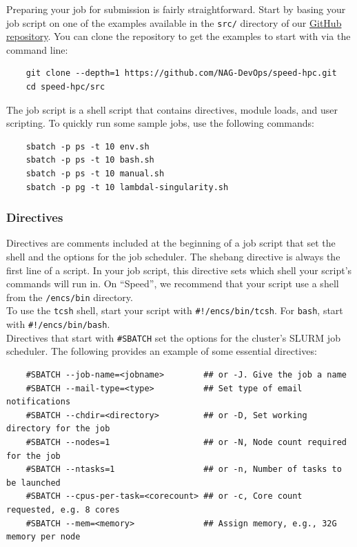 
Preparing your job for submission is fairly straightforward.
Start by basing your job script on one of the examples available in the \texttt{src/}
directory of our \href{https://github.com/NAG-DevOps/speed-hpc}{GitHub repository}.
You can clone the repository to get the examples to start with via the command line:

\begin{verbatim}
    git clone --depth=1 https://github.com/NAG-DevOps/speed-hpc.git
    cd speed-hpc/src
\end{verbatim}

\noindent The job script is a shell script that contains directives, module loads, and user scripting.
To quickly run some sample jobs, use the following commands:
\begin{verbatim}
    sbatch -p ps -t 10 env.sh
    sbatch -p ps -t 10 bash.sh
    sbatch -p ps -t 10 manual.sh
    sbatch -p pg -t 10 lambdal-singularity.sh
\end{verbatim}

\subsubsection{Directives}
\label{sect:directives}

Directives are comments included at the beginning of a job script that set the shell 
and the options for the job scheduler. 
%
The shebang directive is always the first line of a script. In your job script, 
this directive sets which shell your script's commands will run in. On ``Speed'', 
we recommend that your script use a shell from the \texttt{/encs/bin} directory.\\

To use the \texttt{tcsh} shell, start your script with \verb|#!/encs/bin/tcsh|.
For \texttt{bash}, start with \verb|#!/encs/bin/bash|.\\

Directives that start with \verb|#SBATCH| set the options for the cluster's 
SLURM job scheduler. The following provides an example of some essential directives:


\begin{verbatim}
    #SBATCH --job-name=<jobname>        ## or -J. Give the job a name 
    #SBATCH --mail-type=<type>          ## Set type of email notifications
    #SBATCH --chdir=<directory>         ## or -D, Set working directory for the job
    #SBATCH --nodes=1                   ## or -N, Node count required for the job
    #SBATCH --ntasks=1                  ## or -n, Number of tasks to be launched
    #SBATCH --cpus-per-task=<corecount> ## or -c, Core count requested, e.g. 8 cores
    #SBATCH --mem=<memory>              ## Assign memory, e.g., 32G memory per node 
\end{verbatim}
    
